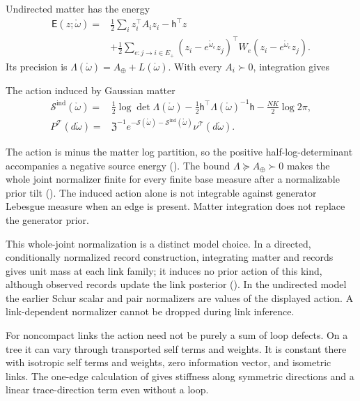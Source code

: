 Undirected matter has the energy
\[
\begin{aligned}
\mathsf E(z;\mathring\omega)
={}&\tfrac12\sum_i z_i^\top A_i z_i-\mathsf h^\top z\\
&+\tfrac12\sum_{e:j\to i\in E_+}(z_i-e^{\mathring\omega_e}z_j)^\top W_e(z_i-e^{\mathring\omega_e}z_j).
\end{aligned}
\]
Its precision is \(\Lambda(\mathring\omega)=A_\oplus+L(\mathring\omega)\). With every
\(A_i\succ0\), integration gives
\begin{keyequation}{The action induced by Gaussian matter}
\[
\begin{aligned}
\mathscr S^{\mathrm{ind}}(\mathring\omega)
={}&\tfrac12\log\det\Lambda(\mathring\omega)
-\tfrac12\mathsf h^\top\Lambda(\mathring\omega)^{-1}\mathsf h-\tfrac{NK}{2}\log2\pi,\\
P^{\mathscr T}(d\mathring\omega)
={}&\mathfrak Z^{-1}e^{-\mathscr S(\mathring\omega)-\mathscr S^{\mathrm{ind}}(\mathring\omega)}
\nu^{\mathscr T}(d\mathring\omega).
\end{aligned}
\]
\end{keyequation}
The action is minus the matter log partition, so the positive half-log-determinant accompanies
a negative source energy (). The bound
\(\Lambda\succeq A_\oplus\succ0\) makes the whole joint normalizer finite for every finite base
measure after a normalizable prior tilt (). The induced action alone
is not integrable against generator Lebesgue measure when an edge is present. Matter integration
does not replace the generator prior.

This whole-joint normalization is a distinct model choice. In a directed, conditionally normalized
record construction, integrating matter and records gives unit mass at each link family; it
induces no prior action of this kind, although observed records update the link posterior
(). In the undirected model the earlier Schur scalar and pair
normalizers are values of the displayed action. A link-dependent normalizer cannot be dropped
during link inference.

For noncompact links the action need not be purely a sum of loop defects. On a tree it can vary
through transported self terms and weights. It is constant there with isotropic self terms and
weights, zero information vector, and isometric links. The one-edge calculation of
 gives stiffness along symmetric directions and a linear trace-direction
term even without a loop.

